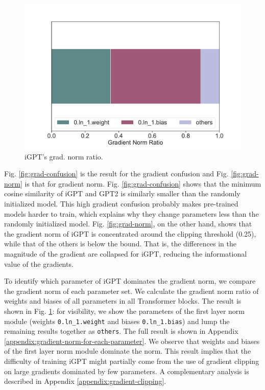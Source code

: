\begin{figure}[ht]
\begin{minipage}[b]{0.32\linewidth}
        \includegraphics[width=\linewidth]{figs/gradnorm_perparam_ratio_1_igpt_hopper_medium_666.pdf}
        \caption{iGPT's grad. norm ratio.}
        \label{fig:grad-norm-param-ratio}
    \end{minipage}
\end{figure}

Fig. \ref{fig:grad-confusion} is the result for the gradient confusion and Fig. \ref{fig:grad-norm} is that for gradient norm. Fig. \ref{fig:grad-confusion} shows that the minimum cosine similarity of iGPT and GPT2 is similarly smaller than the randomly initialized model. This high gradient confusion probably makes pre-trained models harder to train, which explains why they change parameters less than the randomly initialized model. Fig. \ref{fig:grad-norm},
on the other hand, shows that the gradient norm of iGPT is concentrated around the clipping threshold (0.25), while that of the others is below the bound. That is, the differences in the magnitude of the gradient are collapsed for iGPT, reducing the informational value of the gradients. 

To identify which parameter of iGPT dominates the gradient norm, we compare the gradient norm of each parameter set. We calculate the gradient norm ratio of weights and biases of all parameters in all Transformer blocks. The result is shown in Fig. \ref{fig:grad-norm-param-ratio}: for visibility, we show the parameters of the first layer norm module (weights \lstinline{0.ln_1.weight} and biases \lstinline{0.ln_1.bias}) and lump the remaining results together as \lstinline{others}. The full result is shown in Appendix \ref{appendix:gradient-norm-for-each-parameter}. We observe that weights and biases of the first layer norm module dominate the norm. This result implies that the difficulty of training iGPT might partially come from the use of gradient clipping on large gradients dominated by few parameters. A complementary analysis is described in Appendix \ref{appendix:gradient-clipping}.

